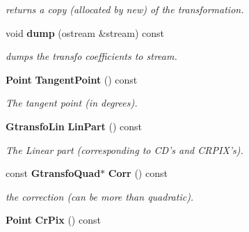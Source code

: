 \begin{CompactItemize}
\begin{CompactList}\small\item\em returns a copy (allocated by new) of the transformation.\item\end{CompactList}\item 
{}
void {\bf dump} (ostream \&stream) const\label{class_tanpix2radec_a12}

\begin{CompactList}\small\item\em dumps the transfo coefficients to stream.\item\end{CompactList}\item 
{}
{\bf Point} {\bf Tangent\-Point} () const\label{class_tanpix2radec_a13}

\begin{CompactList}\small\item\em The tangent point (in degrees).\item\end{CompactList}\item 
{}
{\bf Gtransfo\-Lin} {\bf Lin\-Part} () const\label{class_tanpix2radec_a14}

\begin{CompactList}\small\item\em The Linear part (corresponding to CD's and CRPIX's).\item\end{CompactList}\item 
{}
const {\bf Gtransfo\-Quad}$\ast$ {\bf Corr} () const\label{class_tanpix2radec_a15}

\begin{CompactList}\small\item\em the correction (can be more than quadratic).\item\end{CompactList}\item 
{}
{\bf Point} {\bf Cr\-Pix} () const\label{class_tanpix2radec_a16}


\end{CompactItemize}
